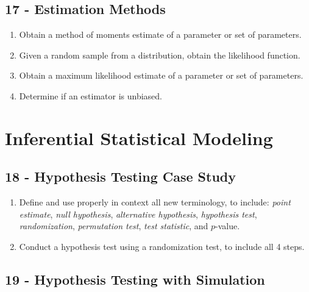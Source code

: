 \documentclass[
  letterpaper,
  DIV=11,
  numbers=noendperiod]{scrreprt}
\begin{document}
\subsection*{17 - Estimation Methods}\label{estimation-methods}

\begin{enumerate}
\def\labelenumi{\arabic{enumi})}
\item
  Obtain a method of moments estimate of a parameter or set of
  parameters.
\item
  Given a random sample from a distribution, obtain the likelihood
  function.
\item
  Obtain a maximum likelihood estimate of a parameter or set of
  parameters.
\item
  Determine if an estimator is unbiased.
\end{enumerate}

\section*{Inferential Statistical
Modeling}\label{inferential-statistical-modeling}


\subsection*{18 - Hypothesis Testing Case
Study}\label{hypothesis-testing-case-study}

\begin{enumerate}
\def\labelenumi{\arabic{enumi})}
\item
  Define and use properly in context all new terminology, to include:
  \emph{point estimate}, \emph{null hypothesis}, \emph{alternative
  hypothesis}, \emph{hypothesis test}, \emph{randomization},
  \emph{permutation test}, \emph{test statistic}, and \(p\)-value.
\item
  Conduct a hypothesis test using a randomization test, to include all 4
  steps.
\end{enumerate}

\subsection*{19 - Hypothesis Testing with
Simulation}\label{hypothesis-testing-with-simulation}
\end{document}
